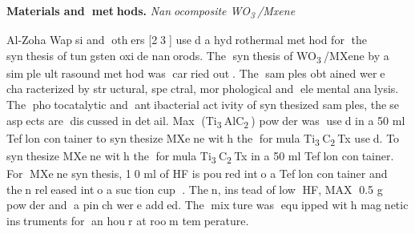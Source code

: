 {%
% 
% 
% 
% 
% 
% 
% 
% 

{\bfseries Materials and methods.} \emph{Nanocomposite
WO\textsubscript{3}/Mxene}

Al-Zoha Wapsi and others {[}23{]} used a hydrothermal method
for the synthesis of tungsten oxide nanorods. The synthesis of
WO\textsubscript{3}/MXene by a simple ultrasound method was
carried out. The samples obtained were characterized by
structural, spectral, morphological and elemental analysis. The
photocatalytic and antibacterial activity of synthesized samples,
these aspects are discussed in detail. Max
(Ti\textsubscript{3}AlC\textsubscript{2}) powder was used in a 50
ml Teflon container to synthesize MXene with the formula
Ti\textsubscript{3}C\textsubscript{2}Tx used. To synthesize MXene
with the formula Ti\textsubscript{3}C\textsubscript{2}Tx in a 50 ml
Teflon container. For MXene synthesis, 10 ml of HF is poured
into a Teflon container and then released into a suction cup .
Then, instead of low HF, MAX 0.5 g powder and a pinch were
added. The mixture was equipped with magnetic instruments for
an hour at room temperature.

}
